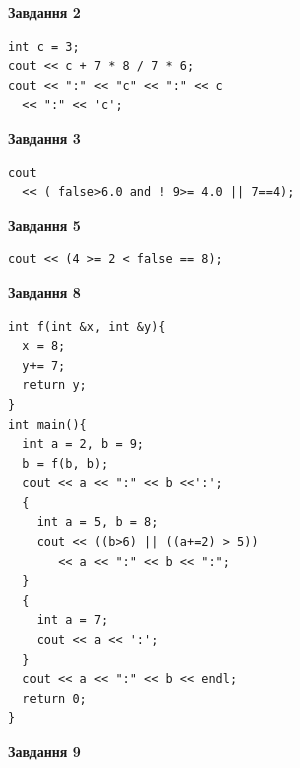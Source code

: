 \documentclass[12pt, ukrainian]{article}
\begin{document}
{\begin {large}
\begin{minipage}[t]{7.0cm}
\end{minipage}
\vline \hspace{1mm}
\begin{minipage}[t]{11.0cm}

\begin{center}
\textbf{Завдання 2}
\end{center}
\vspace{-8mm}

\begin{verbatim}
int c = 3;
cout << c + 7 * 8 / 7 * 6;
cout << ":" << "c" << ":" << c 
  << ":" << 'c';
\end{verbatim}



\begin{center}
\textbf{Завдання 3}
\end{center}
\vspace{-8mm}

\begin{verbatim}
cout 
  << ( false>6.0 and ! 9>= 4.0 || 7==4);
\end{verbatim}



\begin{center}
\textbf{Завдання 5}
\end{center}
\vspace{-8mm}

\begin{verbatim}
cout << (4 >= 2 < false == 8);
\end{verbatim}



\begin{center}
\textbf{Завдання 8}
\end{center}
\vspace{-8mm}

\begin{verbatim}
int f(int &x, int &y){
  x = 8;
  y+= 7;
  return y;
}
int main(){
  int a = 2, b = 9;
  b = f(b, b);
  cout << a << ":" << b <<':';
  {
    int a = 5, b = 8;
    cout << ((b>6) || ((a+=2) > 5))
       << a << ":" << b << ":";
  }
  {
    int a = 7;
    cout << a << ':';
  }
  cout << a << ":" << b << endl;
  return 0;
}
\end{verbatim}

\end{minipage}


\begin{minipage}[t]{7.0cm}

\begin{center}
\textbf{Завдання 9}
\end{center}
\vspace{-8mm}


\end{minipage}
\end{large}}
\end{document}
